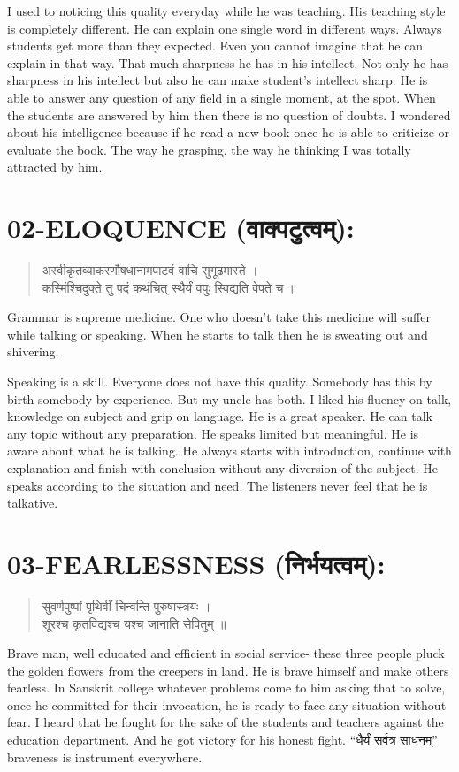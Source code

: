 I used to noticing this quality everyday while he was teaching. His teaching style is completely different. He can explain one single word in different ways. Always students get more than they expected. Even you cannot imagine that he can explain in that way. That much sharpness he has in his intellect. Not only he has sharpness in his intellect but also he can make student’s intellect sharp.  He is able to answer any question of any field in a single moment, at the spot. When the students are answered by him then there is no question of doubts. I wondered about his intelligence because if he read a new book once he is able to criticize or evaluate the book. The way he grasping, the way he thinking I was totally attracted by him.

\section*{02-ELOQUENCE (वाक्पटुत्वम्):}
\begin{verse}
अस्वीकृतव्याकरणौषधानामपाटवं वाचि सुगूढमास्ते ।\\
कस्मिंश्चिदुक्ते तु पदं कथंचित् स्थैर्यं वपुः स्विद्यति वेपते च ॥
\end{verse}
Grammar is supreme medicine. One who doesn’t take this medicine will suffer while talking or speaking. When he starts to talk then he is sweating out and shivering.

Speaking is a skill. Everyone does not have this quality. Somebody has this by birth somebody by experience. But my uncle has both. I liked his fluency on talk, knowledge on subject and grip on language. He is a great speaker. He can talk any topic without any preparation. He speaks limited but meaningful. He is aware about what he is talking. He always starts with introduction, continue with explanation and finish with conclusion without any diversion of the subject. He speaks according to the situation and need. The listeners never feel that he is talkative.

\section*{03-FEARLESSNESS (निर्भयत्वम्):}
\begin{verse}
सुवर्णपुष्पां पृथिवीं चिन्वन्ति पुरुषास्त्रयः ।\\
शूरश्च कृतविद्यश्च यश्च जानाति सेवितुम् ॥
\end{verse}
Brave man, well educated and efficient in social service- these three people pluck the golden flowers from the creepers in land.
He is brave himself and make others fearless. In Sanskrit college whatever problems come to him asking that to solve, once he committed for their invocation, he is ready to face any situation without fear. I heard that he fought for the sake of the students and teachers against the education department. And he got victory for his honest fight. “धैर्यं सर्वत्र साधनम्” braveness is instrument everywhere.

